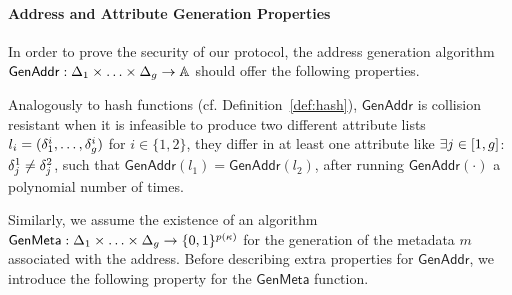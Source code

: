 \paragraph{Address and Attribute Generation Properties}
In order to prove the security of our protocol, the address generation
algorithm $\mathsf{GenAddr}: \Delta_1 \times \ldots \times
\Delta_g \rightarrow \mathbb{A}$ should offer the following
properties.
\begin{definition}\label{def:address_collision}
    Analogously to hash functions (cf.
    Definition~\ref{def:hash}), $\mathsf{GenAddr}$ is collision
    resistant when it is infeasible to produce two different attribute lists
    $l_i = (\delta^{i}_{1}, \dots, \delta^{i}_{g})$ for $i \in \{1, 2\}$,
    \ie they differ in at least one attribute like $\exists j \in [1,
    g]$: $\delta^{1}_j \neq \delta^{2}_j$, such that
    $\mathsf{GenAddr}(l_1) = \mathsf{GenAddr}(l_2)$, after running
    $\mathsf{GenAddr}(\cdot)$ a polynomial number of times.
\end{definition}

Similarly, we assume the existence of an algorithm $\mathsf{GenMeta}:\Delta_1
\times \ldots \times \Delta_g \rightarrow \{0,1\}^{p(\kappa)}$
for the generation of the metadata $m$ associated with the address. Before
describing extra properties for $\mathsf{GenAddr}$,  we introduce the following
property for the $\mathsf{GenMeta}$ function.

